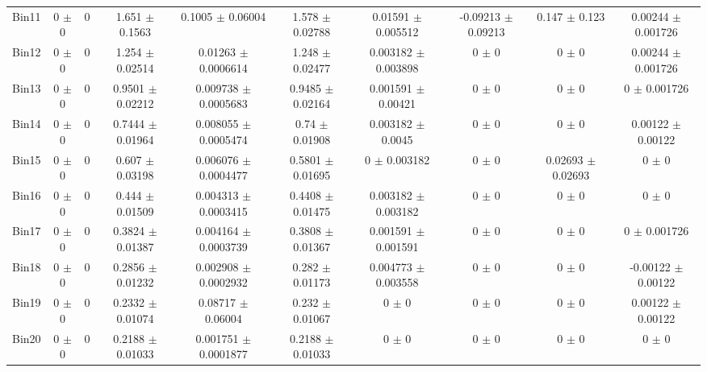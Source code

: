 \begin{tabular}{@{\extracolsep{4pt}}lccccccccc@{}}
     Bin11 & 0 $\pm$ 0 & 0 & 1.651 $\pm$ 0.1563 & 0.1005 $\pm$ 0.06004 & 1.578 $\pm$ 0.02788 & 0.01591 $\pm$ 0.005512 & -0.09213 $\pm$ 0.09213 & 0.147 $\pm$ 0.123 & 0.00244 $\pm$ 0.001726 \\ 
     Bin12 & 0 $\pm$ 0 & 0 & 1.254 $\pm$ 0.02514 & 0.01263 $\pm$ 0.0006614 & 1.248 $\pm$ 0.02477 & 0.003182 $\pm$ 0.003898 & 0 $\pm$ 0 & 0 $\pm$ 0 & 0.00244 $\pm$ 0.001726 \\ 
     Bin13 & 0 $\pm$ 0 & 0 & 0.9501 $\pm$ 0.02212 & 0.009738 $\pm$ 0.0005683 & 0.9485 $\pm$ 0.02164 & 0.001591 $\pm$ 0.00421 & 0 $\pm$ 0 & 0 $\pm$ 0 & 0 $\pm$ 0.001726 \\ 
     Bin14 & 0 $\pm$ 0 & 0 & 0.7444 $\pm$ 0.01964 & 0.008055 $\pm$ 0.0005474 & 0.74 $\pm$ 0.01908 & 0.003182 $\pm$ 0.0045 & 0 $\pm$ 0 & 0 $\pm$ 0 & 0.00122 $\pm$ 0.00122 \\ 
     Bin15 & 0 $\pm$ 0 & 0 & 0.607 $\pm$ 0.03198 & 0.006076 $\pm$ 0.0004477 & 0.5801 $\pm$ 0.01695 & 0 $\pm$ 0.003182 & 0 $\pm$ 0 & 0.02693 $\pm$ 0.02693 & 0 $\pm$ 0 \\ 
     Bin16 & 0 $\pm$ 0 & 0 & 0.444 $\pm$ 0.01509 & 0.004313 $\pm$ 0.0003415 & 0.4408 $\pm$ 0.01475 & 0.003182 $\pm$ 0.003182 & 0 $\pm$ 0 & 0 $\pm$ 0 & 0 $\pm$ 0 \\ 
     Bin17 & 0 $\pm$ 0 & 0 & 0.3824 $\pm$ 0.01387 & 0.004164 $\pm$ 0.0003739 & 0.3808 $\pm$ 0.01367 & 0.001591 $\pm$ 0.001591 & 0 $\pm$ 0 & 0 $\pm$ 0 & 0 $\pm$ 0.001726 \\ 
     Bin18 & 0 $\pm$ 0 & 0 & 0.2856 $\pm$ 0.01232 & 0.002908 $\pm$ 0.0002932 & 0.282 $\pm$ 0.01173 & 0.004773 $\pm$ 0.003558 & 0 $\pm$ 0 & 0 $\pm$ 0 & -0.00122 $\pm$ 0.00122 \\ 
     Bin19 & 0 $\pm$ 0 & 0 & 0.2332 $\pm$ 0.01074 & 0.08717 $\pm$ 0.06004 & 0.232 $\pm$ 0.01067 & 0 $\pm$ 0 & 0 $\pm$ 0 & 0 $\pm$ 0 & 0.00122 $\pm$ 0.00122 \\ 
     Bin20 & 0 $\pm$ 0 & 0 & 0.2188 $\pm$ 0.01033 & 0.001751 $\pm$ 0.0001877 & 0.2188 $\pm$ 0.01033 & 0 $\pm$ 0 & 0 $\pm$ 0 & 0 $\pm$ 0 & 0 $\pm$ 0 \\ 
\hline\hline
  \end{tabular}
